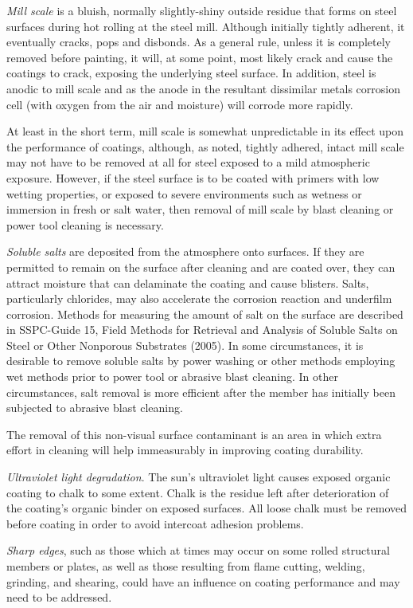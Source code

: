\emph{Mill scale} is a bluish, normally slightly-shiny outside residue that forms on steel surfaces during hot rolling at the
steel mill. Although initially tightly adherent, it eventually cracks, pops and disbonds. As a general rule, unless it is
completely removed before painting, it will, at some point, most likely crack and cause the coatings to crack,
exposing the underlying steel surface. In addition, steel is anodic to mill scale and as the anode in the resultant
dissimilar metals corrosion cell (with oxygen from the air and moisture) will corrode more rapidly.

At least in the short term, mill scale is somewhat unpredictable in its effect upon the performance of coatings,
although, as noted, tightly adhered, intact mill scale may not have to be removed at all for steel exposed to a mild
atmospheric exposure. However, if the steel surface is to be coated with primers with low wetting properties, or
exposed to severe environments such as wetness or immersion in fresh or salt water, then removal of mill scale by
blast cleaning or power tool cleaning is necessary.

\emph{Soluble salts} are deposited from the atmosphere onto surfaces. If they are permitted to remain on the surface
after cleaning and are coated over, they can attract moisture that can delaminate the coating and cause blisters. Salts,
particularly chlorides, may also accelerate the corrosion reaction and underfilm corrosion. Methods for measuring
the amount of salt on the surface are described in SSPC-Guide 15, Field Methods for Retrieval and Analysis of
Soluble Salts on Steel or Other Nonporous Substrates (2005). In some circumstances, it is desirable to remove
soluble salts by power washing or other methods employing wet methods prior to power tool or abrasive blast
cleaning. In other circumstances, salt removal is more efficient after the member has initially been subjected to
abrasive blast cleaning.

The removal of this non-visual surface contaminant is an area in which extra effort in cleaning will help
immeasurably in improving coating durability.

\emph{Ultraviolet light degradation}. The sun’s ultraviolet light causes exposed organic coating to chalk to some
extent. Chalk is the residue left after deterioration of the coating’s organic binder on exposed surfaces. All loose
chalk must be removed before coating in order to avoid intercoat adhesion problems.

\emph{Sharp edges}, such as those which at times may occur on some rolled structural members or plates, as well as
those resulting from flame cutting, welding, grinding, and shearing, could have an influence on coating performance
and may need to be addressed.

